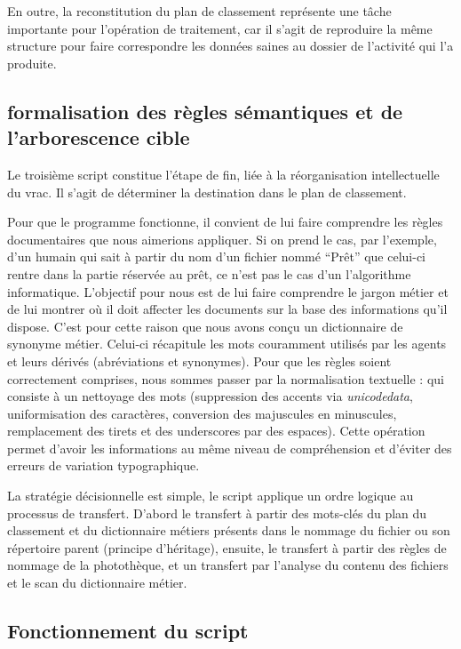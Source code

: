 En outre, la reconstitution du plan de classement représente une tâche importante pour l'opération de traitement, car il s'agit de reproduire la même structure pour faire correspondre les données saines au dossier de l'activité qui l'a produite.


\subsection*{formalisation des règles sémantiques et de l'arborescence cible}

Le troisième script constitue l'étape de fin, liée à la réorganisation intellectuelle du vrac. Il s'agit de déterminer la destination dans le plan de classement. 

Pour que le programme fonctionne, il convient de lui faire comprendre les règles documentaires que nous aimerions appliquer. Si on prend le cas, par l'exemple, d'un humain qui sait à partir du nom d'un fichier nommé \enquote{Prêt} que celui-ci rentre dans la partie réservée au prêt, ce n'est pas le cas d'un l'algorithme informatique. L'objectif pour nous est de lui faire comprendre le jargon métier et de lui montrer où il doit affecter les documents sur la base des informations qu'il dispose. C'est pour cette raison que nous avons conçu un dictionnaire de synonyme métier. Celui-ci récapitule les mots couramment utilisés par les agents et leurs dérivés (abréviations et synonymes). Pour que les règles soient correctement comprises, nous sommes passer par la normalisation textuelle : qui consiste à un nettoyage des mots (suppression des accents via \textit{unicodedata}, uniformisation des caractères, conversion des majuscules en minuscules, remplacement des tirets et des underscores par des espaces). Cette opération permet d'avoir les informations au même niveau de compréhension et d'éviter des erreurs de variation typographique. 

La stratégie décisionnelle est simple, le script applique un ordre logique au processus de transfert. D'abord le transfert à partir des mots-clés du plan du classement et du dictionnaire métiers présents dans le nommage du fichier ou son répertoire parent (principe d'héritage), ensuite, le transfert à partir des règles de nommage de la photothèque, et un transfert par l'analyse du contenu des fichiers et le scan du dictionnaire métier.

\subsection*{Fonctionnement du script}

